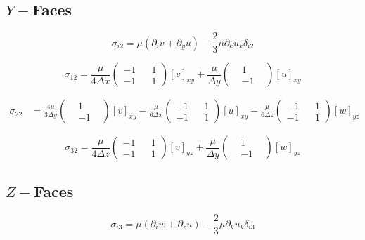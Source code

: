 \documentclass{article}
\begin{document}
\subsection{$Y-$Faces}
\begin{equation*}
  \sigma_{i2} = \mu\left(\partial_i v + \partial_y u\right) - \frac{2}{3}\mu\partial_k u_k\delta_{i2}
\end{equation*}

\begin{equation*}
  \sigma_{12} = \frac{\mu}{4\Delta x}\begin{pmatrix} -1 & & 1 \\ -1 & & 1 \end{pmatrix}[v]_{xy} + \frac{\mu}{\Delta y}\begin{pmatrix} & 1 & \\ & -1 & \end{pmatrix}[u]_{xy}
\end{equation*}

\begin{align*}
  \sigma_{22} &= \frac{4\mu}{3\Delta y}\begin{pmatrix} & 1 & \\ & -1 & \end{pmatrix}[v]_{xy} - \frac{\mu}{6\Delta x}\begin{pmatrix} -1 & & 1 \\ -1 & & 1 \end{pmatrix}[u]_{xy} - \frac{\mu}{6\Delta z}\begin{pmatrix} -1 & & 1 \\ -1 & & 1 \end{pmatrix}[w]_{yz}
\end{align*}

\begin{equation*}
  \sigma_{32} = \frac{\mu}{4\Delta z}\begin{pmatrix} -1 & & 1 \\ -1 & & 1 \end{pmatrix}[v]_{yz} + \frac{\mu}{\Delta y}\begin{pmatrix} & 1 & \\ & -1 & \end{pmatrix}[w]_{yz}
\end{equation*}

\subsection{$Z-$Faces}
\begin{equation*}
  \sigma_{i3} = \mu\left(\partial_i w + \partial_z u\right) - \frac{2}{3}\mu\partial_k u_k\delta_{i3}
\end{equation*}
\end{document}
